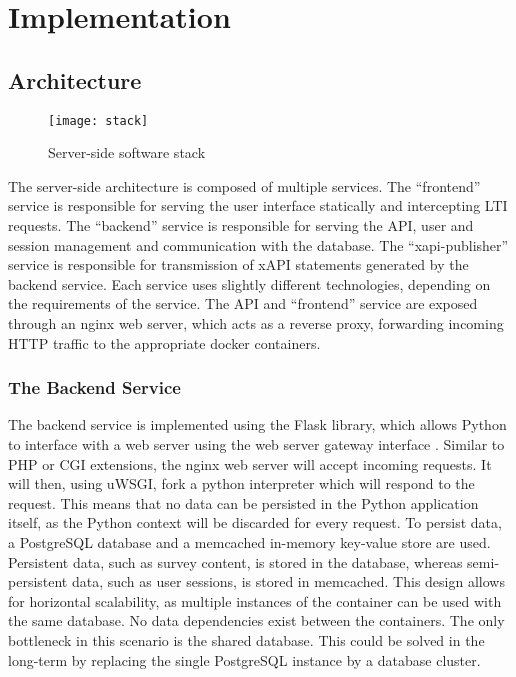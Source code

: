 \section{Implementation}
\label{section:implementation:architecture}
\subsection{Architecture}
    \begin{figure}[H]
        \centering
        \texttt{[image: stack]}
        \caption{Server-side software stack}
        \label{fig:stack}
    \end{figure}

    The server-side architecture is composed of multiple services.
    The ``frontend'' service is responsible for serving the
    user interface statically and intercepting LTI requests.
    The ``backend'' service is responsible for serving the API,
    user and session management and communication with the database.
    The ``xapi-publisher'' service is responsible for transmission
    of xAPI statements generated by the backend service.
    Each service uses slightly different technologies, depending
    on the requirements of the service. The API and ``frontend'' service
    are exposed through an nginx web server, which acts as a reverse
    proxy, forwarding incoming HTTP traffic to the appropriate docker
    containers.

    \subsubsection{The Backend Service}
        The backend service is implemented using the Flask
        library, which allows Python to interface with a web server
        using the web server gateway interface \cite{pep-333}. Similar
        to PHP or CGI extensions, the nginx web server will accept incoming
        requests. It will then, using uWSGI, fork a python interpreter
        which will respond to the request. This means that no data
        can be persisted in the Python application itself, as the
        Python context will be discarded for every request.
        To persist data, a PostgreSQL database and a memcached
        in-memory key-value store are used.
        Persistent data, such as survey content, is stored
        in the database, whereas semi-persistent data, such as user
        sessions, is stored in memcached. This design allows
        for horizontal scalability, as multiple instances of the
         container can be used with the same database.
        No data dependencies exist between the  containers.
        The only bottleneck in this scenario is the shared database.
        This could be solved in the long-term by replacing the single PostgreSQL
        instance by a database cluster.

